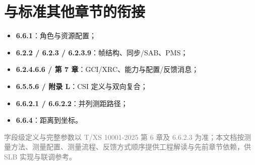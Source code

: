 \documentclass[11pt,a4paper]{ctexart}
\begin{document}
\section{与标准其他章节的衔接}

\begin{itemize}[nosep]
  \item \textbf{6.6.1}：角色与资源配置；
  \item \textbf{6.2.2 / 6.2.3 / 6.2.3.9}：帧结构、同步/SAB、PMS；
  \item \textbf{6.2.4.6.6 / 第 7 章}：GCI/XRC、能力与配置/反馈消息；
  \item \textbf{6.5.5.6 / 附录 L}：CSI 定义与双向复合；
  \item \textbf{6.6.2.1 / 6.6.2.2}：并列测距路径；
  \item \textbf{6.6.4}：距离到坐标。
\end{itemize}

\vfill
\begin{center}
\small\textcolor{gray}{字段级定义与完整参数以 T/XS 10001-2025 第 6 章及 6.6.2.3 为准；本文档按测量方法、测量配置、测量流程、反馈方式顺序提供工程解读与先前章节依赖，供 SLB 实现与联调参考。}
\end{center}
\end{document}
